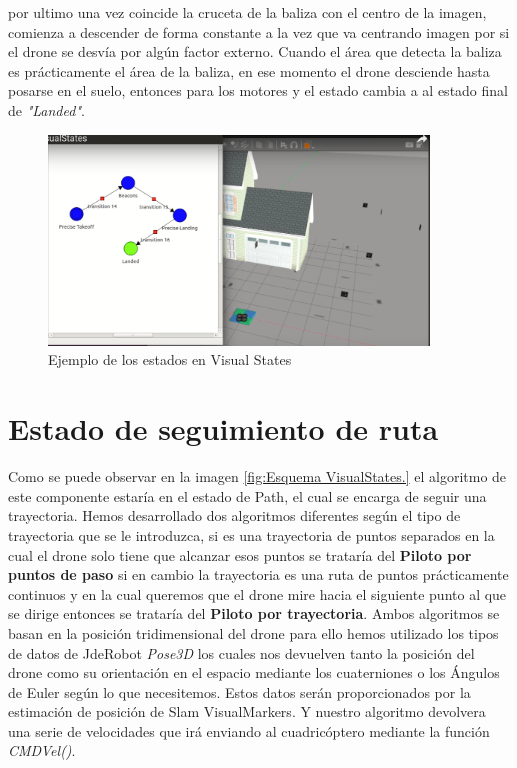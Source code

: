 \hspace{1cm} por ultimo una vez coincide la cruceta de la baliza con el centro de la imagen, comienza a descender de forma constante a la vez que va centrando imagen por si el drone se desvía por algún factor externo. Cuando el área que detecta la baliza es prácticamente el área de la baliza, en ese momento el drone desciende  hasta  posarse en el suelo, entonces para los motores y el estado cambia a al estado final de \textit{"Landed"}.

\begin{figure}[H]
	\begin{center}
		\includegraphics[width=0.9\textwidth]{imag/IMG34.png}
				\caption{Ejemplo de los estados en Visual States}
		\label{fig:Ejemplo Visual States.}	
	\end{center}
\end{figure}

\section{Estado de seguimiento de ruta}
\hspace{1cm} Como se puede observar en la imagen \ref{fig:Esquema VisualStates.} el algoritmo de este componente estaría en el estado de Path, el cual se encarga de seguir una trayectoria. Hemos desarrollado dos algoritmos diferentes según el tipo de trayectoria que se le introduzca, si es una trayectoria de puntos separados en la cual el drone solo tiene que alcanzar esos puntos se trataría del \textbf{Piloto por puntos de paso} si en cambio la trayectoria es una ruta de puntos prácticamente continuos y en la cual queremos que el drone mire hacia el siguiente punto al que se dirige entonces se trataría del \textbf{Piloto por trayectoria}. Ambos algoritmos se basan en la posición tridimensional del drone para ello hemos utilizado los tipos de datos de JdeRobot \textit{Pose3D} los cuales nos devuelven tanto la posición del drone como su orientación en el espacio mediante los cuaterniones o los Ángulos de Euler según lo que necesitemos. Estos datos serán proporcionados por la estimación de posición de Slam VisualMarkers. Y nuestro algoritmo devolvera una serie de velocidades que irá enviando al cuadricóptero mediante la función \textit{CMDVel()}.

